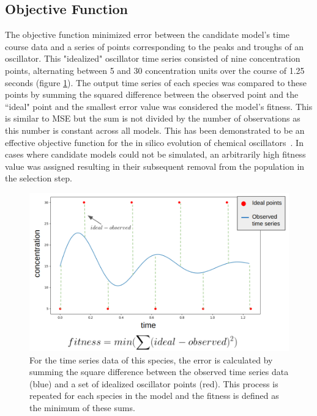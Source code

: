 \documentclass[12pt]{report}
\begin{document}
\subsection{Objective Function}

The objective function minimized error between the candidate model's time course data and a series of points corresponding to the peaks and troughs of an oscillator. This "idealized" oscillator time series consisted of nine concentration points, alternating between 5 and 30 concentration units over the course of 1.25 seconds (figure \ref{fig:fitness}). The output time series of each species was compared to these points by summing the squared difference between the observed point and the ``ideal" point and the smallest error value was considered the model's fitness. This is similar to MSE but the sum is not divided by the number of observations as this number is constant across all models. This has been demonstrated to be an effective objective function for the in silico evolution of chemical oscillators~\cite{Paladugu2006}.  In cases where candidate models could not be simulated, an arbitrarily high fitness value was assigned resulting in their subsequent removal from the population in the selection step.  

\begin{figure}
    \centering
    \includegraphics[width=15cm]{images/fitness.png}
    \caption[Oscillator objective function]{For the time series data of this species, the error is calculated by summing the square difference between the observed time series data (blue) and a set of idealized oscillator points (red). This process is repeated for each species in the model and the fitness is defined as the minimum of these sums. }
    \label{fig:fitness}
\end{figure}
\end{document}
